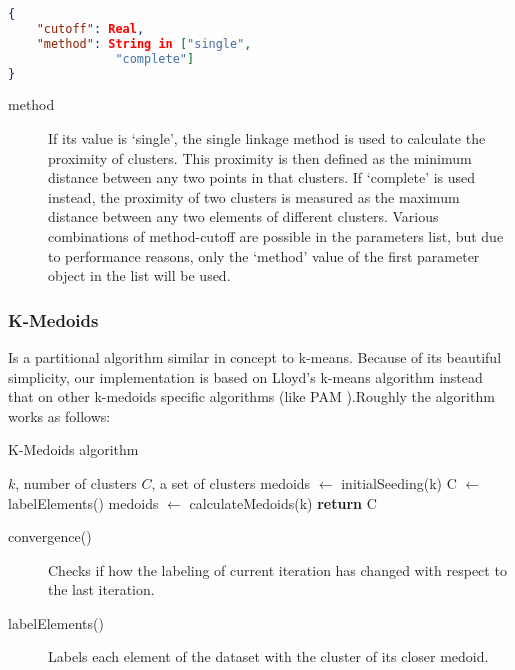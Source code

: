 \begin{lstlisting}[language=json, firstnumber=1] 
{ 	
	"cutoff": Real, 
	"method": String in ["single", 
			   "complete"] 
}
\end{lstlisting}
\begin{description}
\item [method] If its value is `single', the single linkage method
is used to calculate the proximity of clusters. This proximity is
then defined as the minimum distance between any two points in that
clusters. If `complete' is used instead, the proximity of two clusters
is measured as the maximum distance between any two elements of different
clusters. Various combinations of method-cutoff are possible in
the parameters list, but due to performance reasons, only the `method'
value of the first parameter object in the list will be used.
\end{description}

\subsubsection{K-Medoids}

Is a partitional algorithm similar in concept to k-means. Because
of its beautiful simplicity, our implementation is based on Lloyd's
k-means algorithm \cite{lloyd_least_1982} instead that on other k-medoids
specific algorithms (like PAM \cite{kaufman_finding_1990-1}).Roughly the algorithm works as follows:

\begin{algorithm}[H]
\caption{K-Medoids algorithm}
\begin{algorithmic}[1]
\Input $k$, number of clusters
\Output $C$, a set of clusters
\State medoids $\gets$ initialSeeding(k)\;
%
\State C $\gets$ labelElements()\;
\State medoids $\gets$ calculateMedoids(k)\;
\EndWhile
\State \textbf{return} C
\end{algorithmic}	
\end{algorithm}

\begin{description}
	\item[convergence()]  Checks if how the labeling of current iteration has changed with respect to the last iteration.
	\item[labelElements()] Labels each element of the dataset with the cluster of its closer medoid. 
\end{description}

